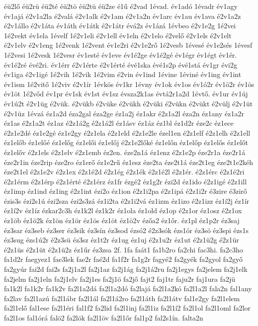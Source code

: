 {éü2lő
éü2rü
éü2té
éü2tö
éü2tü
éü2ze
é1ű
é2vad
1évad.
év1adó
1évadr
év1agy
év1ajá
é2v1a2la
é2valá
é2v1alk
é2v1am
é2v1a2n
év1arc
év1au
év1ava
é2v1a2z
é2v1állo
é2v1áta
év1áth
év1átk
é2v1átr
évá2z
év1ázá
1évbeo
é2v1e2g
1é2vei
1é2vekt
év1ela
1évelf
1é2v1eli
é2v1ell
év1eln
é2v1elo
é2velő
é2v1els
é2v1elt
é2v1elv
é2v1eng
1é2venk
1é2vent
év1e2ri
é2v1e2rő
1é2vesb
1évesé
év1e2sés
1évesf
1é2vesi
1é2vesk
1é2vesr
év1esté
év1eve
év1é2ge
év1é2gé
év1égr
év1égt
év1ér.
év1é2ré
évé2ri.
év1érr
é2v1érte
é2v1érté
évé1ska
évé1s2p
évé1stá
év1gr
évi2g
év1iga
é2v1igé
1é2vih
1é2vik
1é2vim
é2vin
év1ind
1évine
1éviné
év1ing
év1int
év1ism
1é2vitő
1é2viv
é2v1ír
1évkös
év1kr
1évny
év1ok
év1os
év1ó2r
év1ö2r
év1ös
év1öt
1é2vőd
év1pr
év1sk
év1st
év1sz
évsza2k1as
évtá2r1a2d
1évtő.
év1ur
év1új
év1ú2t
é2v1üg
é2vük.
é2vükb
é2vüke
é2vükh
é2vüki
é2vükn
é2vükt
é2vülj
é2v1üt
é2v1üz
1évzá
éz1a2d
éza2gal
éza2ge
éz1a2j
éz1akr
é2z1a2l
éza2n
éz1any
éz1a2r
éz1as
é2z1a2t
éz1az
é2z1á2g
é2z1á2l
éz1ásv
éz1áz
éz1bl
éz1d2r
éze2c
éz1ece
é2z1e2dé
éz1e2gé
éz1e2gy
é2z1ela
é2z1eld
é2z1e2le
ézel1en
é2z1elf
é2z1elh
é2z1ell
éz1előb
éz1előé
éz1előg
éz1elői
éz1előj
é2z1e2lőké
éz1előn
éz1előp
éz1elős
éz1előt
éz1előv
é2z1els
é2z1elv
é2z1emb
éz2en.
éze2n1á
éz1enz
é2z1e2p
éze2r1a
éze2r1á
éze2r1in
éze2rip
éze2ro
éz1erő
éz1e2rű
éz1esz
éze2ta
éze2t1á
éze2t1eg
éze2t1e2kéh
éze2t1el
é2z1e2v
é2z1ex
é2z1é2d
é2z1ég
é2z1ék
é2z1é2l
é2z1ér.
é2z1érc
é2z1é2ri
é2z1érm
é2z1érp
é2z1érté
é2z1érz
éz1fr
ézgé2
éz1g2r
ézi2d
éz1ido
é2z1igé
é2z1ill
éz1imp
éz1ind
éz1ing
é2z1int
ézi2o
éz1ion
é2z1i2pa
é2z1ipá
é2z1i2r
é3zire
é3zirő
ézis3s
ézi2s1ú
ézi2sza
ézi2s3zá
éz1i2ta
é2z1i2vá
éz1izm
éz1izo
é2z1izz
éz1í2j
éz1ír
éz1í2v
éz1íz
ézkar2c3h
éz1k2l
éz1k2r
éz1ola
éz1old
éz1op
é2z1or
éz1osz
é2z1ox
éz1öb
éz1ö2k
éz1ön
éz1ör
éz1ös
éz1öt
éz1ö2v
ézőa2
éz1őr.
éz1pl
éz1p2r
éz3saj
éz3sar
éz3seb
éz3ser
éz3sik
éz3sín
éz3sod
ézsó2
é2z3sók
ézs1ór
éz3sö
éz3spi
ézs1s
éz3sug
ézs1ú2r
é2z3sü
éz3sz
éz1t2r
éz1ug
éz1uj
é2z1u2r
éz1ut
é2z1ü2g
é2z1ür
é2z1üs
é2z1üt
é2z1ü2z
éz1űr
éz3zsa
2f.
1fa
faát1
fa1b2ro
fa2chi
fac3hi.
fa2c3ho
fa1d2r
faegyez1
fae3lek
fae2r
faé2d
fa1f2r
fa1g2r
fagyé2
fa2gyék
fa2gyol
fa2győ
fa2gyúr
fai2d
fai2s
fa2j1a2l
fa2j1az
fa2j1ág
fa2j1á2ru
fa2j1egys
fa2jelem
fa2j1elk
fa2jelm
fa2j1eln
fa2j1elv
fa2j1es
fa2j1ö
fa2jő
fajt2
faj1tr
faju2r
faj1ura
fa2jü
fa1k2l
fa1k2r
fa1k2v
fa2l1a2dá
fa2l1a2dó
fa2lajá
fa2l1a2kó
fa2l1a2l
fala2n
fal1any
fa2lav
fa2l1azú
fa2l1ábr
fa2l1ál
fa2l1á2ro
fa2l1áth
fa2l1átv
fal1e2gy
fa2l1elem
fa2l1elő
fal1ese
fa2l1éri
fal1f2
fa2lid
fa2l1inj
fa2l1iz
fa2l1í2
fa2l1ol
fa2l1oml
fa2lor
fa2l1os
fal1órá
falö2
fa2lök
fa2l1öv
fa2l1őr
fal1p2
fal2s1ín.
falta2n
}

